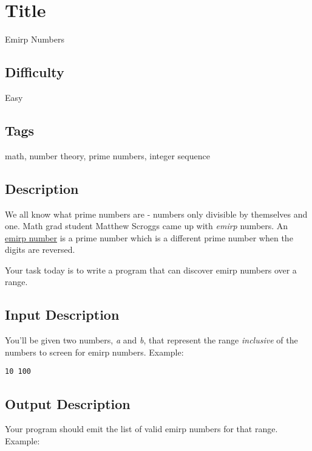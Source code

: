 \section{Title}\label{title-23}

Emirp Numbers

\subsection{Difficulty}\label{difficulty-22}

Easy

\subsection{Tags}\label{tags-23}

math, number theory, prime numbers, integer sequence

\subsection{Description}\label{description-23}

We all know what prime numbers are - numbers only divisible by
themselves and one. Math grad student Matthew Scroggs came up with
\emph{emirp} numbers. An
\href{https://en.wikipedia.org/wiki/Emirp}{emirp number} is a prime
number which is a different prime number when the digits are reversed.

Your task today is to write a program that can discover emirp numbers
over a range.

\subsection{Input Description}\label{input-description-15}

You'll be given two numbers, \emph{a} and \emph{b}, that represent the
range \emph{inclusive} of the numbers to screen for emirp numbers.
Example:

\begin{verbatim}
10 100
\end{verbatim}

\subsection{Output Description}\label{output-description-16}

Your program should emit the list of valid emirp numbers for that range.
Example:

